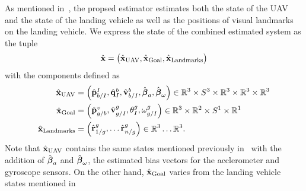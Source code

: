 
As mentioned in~, the propsed estimator estimates both the state of
the UAV and the state of the landing vehicle as well as the positions of visual
landmarks on the landing vehicle.
We express the state of the combined estimated system as the tuple
\begin{equation}
  \hat{\boldsymbol{\mathrm{x}}} =
  \begin{pmatrix}
    \hat{\boldsymbol{\mathrm{x}}}_{\text{UAV}}, \hat{\boldsymbol{\mathrm{x}}}_{\text{Goal}}, \hat{\boldsymbol{\mathrm{x}}}_{\text{Landmarks}}
  \end{pmatrix}
\end{equation}
with the components defined as
\begin{align}
  \hat{\boldsymbol{\mathrm{x}}}_{\text{UAV}} &=
  \begin{pmatrix}
    \hat{\boldsymbol{\mathrm{p}}}_{b/I}^{I}, \hat{\boldsymbol{\mathrm{q}}}_I^{b}, \hat{\boldsymbol{\mathrm{v}}}_{b/I}^b,
    \hat{\boldsymbol{\mathrm{\beta}}}_a,
    \hat{\boldsymbol{\mathrm{\beta}}}_{\omega}
  \end{pmatrix}
  \in \mathbb{R}^3 \times S^3 \times \mathbb{R}^3 \times \mathbb{R}^3 \times
    \mathbb{R}^3  \\
    \hat{\boldsymbol{\mathrm{x}}}_{\text{Goal}} & =
    \begin{pmatrix}
      \hat{\boldsymbol{\mathrm{p}}}_{g/b}^{v}, \hat{\boldsymbol{\mathrm{v}}}_{g/I}^{g}, \theta_{I}^{g},
      \omega_{g/I}^{g}
    \end{pmatrix}
    \in \mathbb{R}^3 \times \mathbb{R}^2 \times S^1 \times \mathbb{R}^1
    \\
    \hat{\boldsymbol{\mathrm{x}}}_{\text{Landmarks}} & =
    \begin{pmatrix}
      \hat{\boldsymbol{\mathrm{r}}}_{1/g}^{g}, \dots \hat{\boldsymbol{\mathrm{r}}}_{n/g}^{g}
    \end{pmatrix}
    \in \mathbb{R}^3 \dots \mathbb{R}^3.
\end{align}
Note that $\hat{\boldsymbol{\mathrm{x}}}_{\text{UAV}}$ contains the same states mentioned previously
in~ with the addition of $\hat{\boldsymbol{\mathrm{\beta}}}_a$ and
$\hat{\boldsymbol{\mathrm{\beta}}}_\omega$, the estimated bias vectors for the acclerometer and
gyroscope sensors. On the
other hand, $\hat{\boldsymbol{\mathrm{x}}}_{\text{Goal}}$ varies 
from the landing vehicle states mentioned in~
